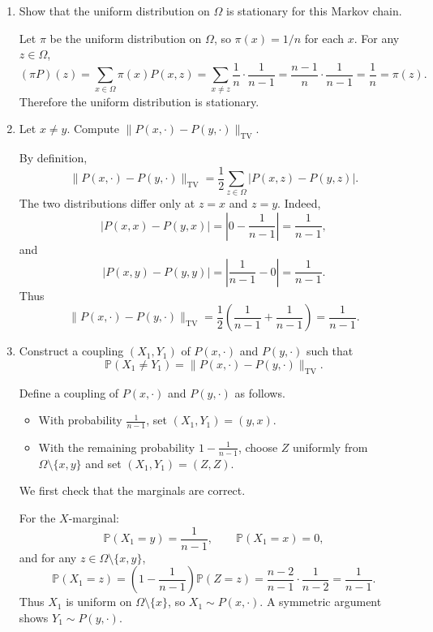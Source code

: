 \documentclass[answers,12pt,addpoints]{exam}
\newcommand{\TV}{\mathrm{TV}}
\begin{document}
\begin{enumerate}
  \item Show that the uniform distribution on $\Omega$ is stationary for this Markov chain.

  \begin{solution}
  Let $\pi$ be the uniform distribution on $\Omega$, so $\pi(x)=1/n$ for each $x$. For any $z \in \Omega$,
  \[
  (\pi P)(z) = \sum_{x\in\Omega} \pi(x)P(x,z)
  = \sum_{x\neq z} \frac{1}{n}\cdot \frac{1}{n-1}
  = \frac{n-1}{n}\cdot \frac{1}{n-1}
  = \frac{1}{n}
  = \pi(z).
  \]
  Therefore the uniform distribution is stationary.
  \end{solution}

  \item Let $x \neq y$. Compute $\|P(x,\cdot) - P(y,\cdot)\|_{\TV}$.

  \begin{solution}
  By definition,
  \[
  \|P(x,\cdot)-P(y,\cdot)\|_{\TV}
  = \frac12 \sum_{z\in\Omega} |P(x,z)-P(y,z)|.
  \]
  The two distributions differ only at $z=x$ and $z=y$. Indeed,
  \[
  |P(x,x)-P(y,x)| = \left|0-\frac{1}{n-1}\right| = \frac{1}{n-1},
  \]
  and
  \[
  |P(x,y)-P(y,y)| = \left|\frac{1}{n-1}-0\right| = \frac{1}{n-1}.
  \]
  Thus
  \[
  \|P(x,\cdot)-P(y,\cdot)\|_{\TV}
  = \frac12\left(\frac{1}{n-1}+\frac{1}{n-1}\right)
  = \frac{1}{n-1}.
  \]
  \end{solution}

  \item Construct a coupling $(X_1,Y_1)$ of $P(x,\cdot)$ and $P(y,\cdot)$ such that
  \[
  \mathbb{P}(X_1 \neq Y_1) = \|P(x,\cdot) - P(y,\cdot)\|_{\TV}.
  \]

\begin{solution}
Define a coupling of $P(x,\cdot)$ and $P(y,\cdot)$ as follows.

\begin{itemize}
  \item With probability $\frac{1}{n-1}$, set $(X_1,Y_1) = (y,x)$.
  \item With the remaining probability $1 - \frac{1}{n-1}$, choose
        $Z$ uniformly from $\Omega \setminus \{x,y\}$ and set
        $(X_1,Y_1) = (Z,Z)$.
\end{itemize}

We first check that the marginals are correct.

For the $X$-marginal:
\[
  \mathbb{P}(X_1 = y)
  = \frac{1}{n-1}, \qquad
  \mathbb{P}(X_1 = x)
  = 0,
\]
and for any $z \in \Omega \setminus \{x,y\}$,
\[
  \mathbb{P}(X_1 = z)
  = \left(1 - \frac{1}{n-1}\right)
    \mathbb{P}(Z = z)
  = \frac{n-2}{n-1} \cdot \frac{1}{n-2}
  = \frac{1}{n-1}.
\]
Thus $X_1$ is uniform on $\Omega \setminus \{x\}$, so
$X_1 \sim P(x,\cdot)$.  A symmetric argument shows
$Y_1 \sim P(y,\cdot)$.


\end{solution}
\end{enumerate}
\end{document}
